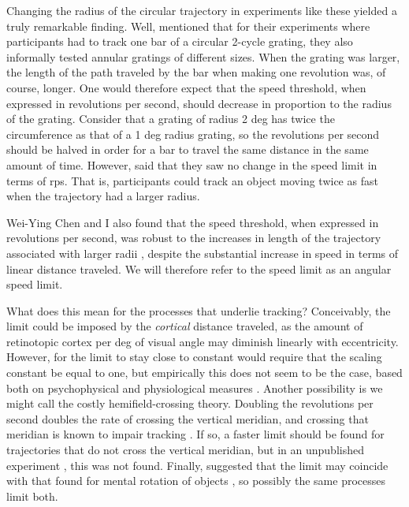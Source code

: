 \documentclass[
]{book}
\begin{document}
Changing the radius of the circular trajectory in experiments like these yielded a truly remarkable finding. Well, \citet{verstratenLimitsAttentiveTracking2000} mentioned that for their experiments where participants had to track one bar of a circular 2-cycle grating, they also informally tested annular gratings of different sizes. When the grating was larger, the length of the path traveled by the bar when making one revolution was, of course, longer. One would therefore expect that the speed threshold, when expressed in revolutions per second, should decrease in proportion to the radius of the grating. Consider that a grating of radius 2 deg has twice the circumference as that of a 1 deg radius grating, so the revolutions per second should be halved in order for a bar to travel the same distance in the same amount of time. However, \citet{verstratenLimitsAttentiveTracking2000} said that they saw no change in the speed limit in terms of rps. That is, participants could track an object moving twice as fast when the trajectory had a larger radius.

Wei-Ying Chen and I also found that the speed threshold, when expressed in revolutions per second, was robust to the increases in length of the trajectory associated with larger radii \citep{holcombeSplittingAttentionReduces2013, holcombeExhaustingAttentionalTracking2012}, despite the substantial increase in speed in terms of linear distance traveled. We will therefore refer to the speed limit as an angular speed limit.

What does this mean for the processes that underlie tracking? Conceivably, the limit could be imposed by the \emph{cortical} distance traveled, as the amount of retinotopic cortex per deg of visual angle may diminish linearly with eccentricity. However, for the limit to stay close to constant would require that the scaling constant be equal to one, but empirically this does not seem to be the case, based both on psychophysical and physiological measures \citep{strasburgerPeripheralVisionPattern2011}. Another possibility is we might call the costly hemifield-crossing theory. Doubling the revolutions per second doubles the rate of crossing the vertical meridian, and crossing that meridian is known to impair tracking \citep{strongHemifieldspecificControlSpatial2020}. If so, a faster limit should be found for trajectories that do not cross the vertical meridian, but in an unpublished experiment \citep{holcombeSpeedLimitAttentional}, this was not found. Finally, \citet{verstratenLimitsAttentiveTracking2000} suggested that the limit may coincide with that found for mental rotation of objects \citep{cooperMentalTransformationsVisual1976}, so possibly the same processes limit both.
\end{document}
